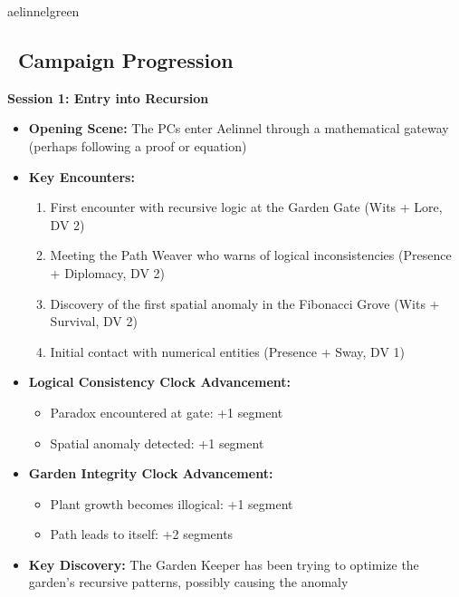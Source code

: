 \documentclass[11pt]{article}
\begin{document}
\begin{campaignsection}{aelinnelgreen}
\subsection*{\faBook\ Campaign Progression}

\textbf{Session 1: Entry into Recursion}
\begin{itemize}
    \item \textbf{Opening Scene:} The PCs enter Aelinnel through a mathematical gateway (perhaps following a proof or equation)
    \item \textbf{Key Encounters:}
    \begin{enumerate}
        \item First encounter with recursive logic at the Garden Gate (Wits + Lore, DV 2)
        \item Meeting the Path Weaver who warns of logical inconsistencies (Presence + Diplomacy, DV 2)
        \item Discovery of the first spatial anomaly in the Fibonacci Grove (Wits + Survival, DV 2)
        \item Initial contact with numerical entities (Presence + Sway, DV 1)
    \end{enumerate}
    \item \textbf{Logical Consistency Clock Advancement:}
    \begin{itemize}
        \item Paradox encountered at gate: +1 segment
        \item Spatial anomaly detected: +1 segment
    \end{itemize}
    \item \textbf{Garden Integrity Clock Advancement:}
    \begin{itemize}
        \item Plant growth becomes illogical: +1 segment
        \item Path leads to itself: +2 segments
    \end{itemize}
    \item \textbf{Key Discovery:} The Garden Keeper has been trying to optimize the garden's recursive patterns, possibly causing the anomaly
\end{itemize}


\end{campaignsection}
\end{document}
